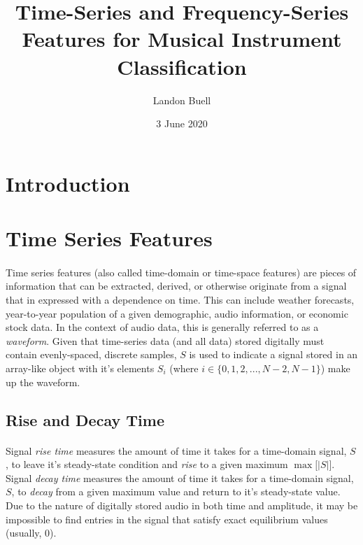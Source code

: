 \documentclass[12pt,letterpaper]{article}
\begin{document}

\title{Time-Series and Frequency-Series Features for Musical Instrument Classification}
\date{3 June 2020}
\author{Landon Buell}
\maketitle


\section{Introduction}



\section{Time Series Features}

\paragraph*{}Time series features (also called time-domain or time-space features) are pieces of information that can be extracted, derived, or otherwise originate from a signal that in expressed with a dependence on time. This can include weather forecasts, year-to-year population of a given demographic, audio information, or economic stock data. In the context of audio data, this is generally referred to as a \textit{waveform}. Given that time-series data (and all data) stored digitally must contain evenly-spaced, discrete samples, $S$ is used to indicate a signal stored in an array-like object with it's elements $S_i$ (where $i \in \{ 0,1,2,...,N-2,N-1\}$) make up the waveform.



\subsection{Rise and Decay Time}

\paragraph*{}Signal \textit{rise time} measures the amount of time it takes for a time-domain signal, $S$, to leave it's steady-state condition and \textit{rise} to a given maximum $\max\big[|S|\big]$. Signal \textit{decay time} measures the amount of time it takes for a time-domain signal, $S$, to \textit{decay} from a given maximum value and return to it's steady-state value. Due to the nature of digitally stored audio in both time and amplitude, it may be impossible to find entries in the signal that satisfy exact equilibrium values (usually, $0$).
\end{document}
